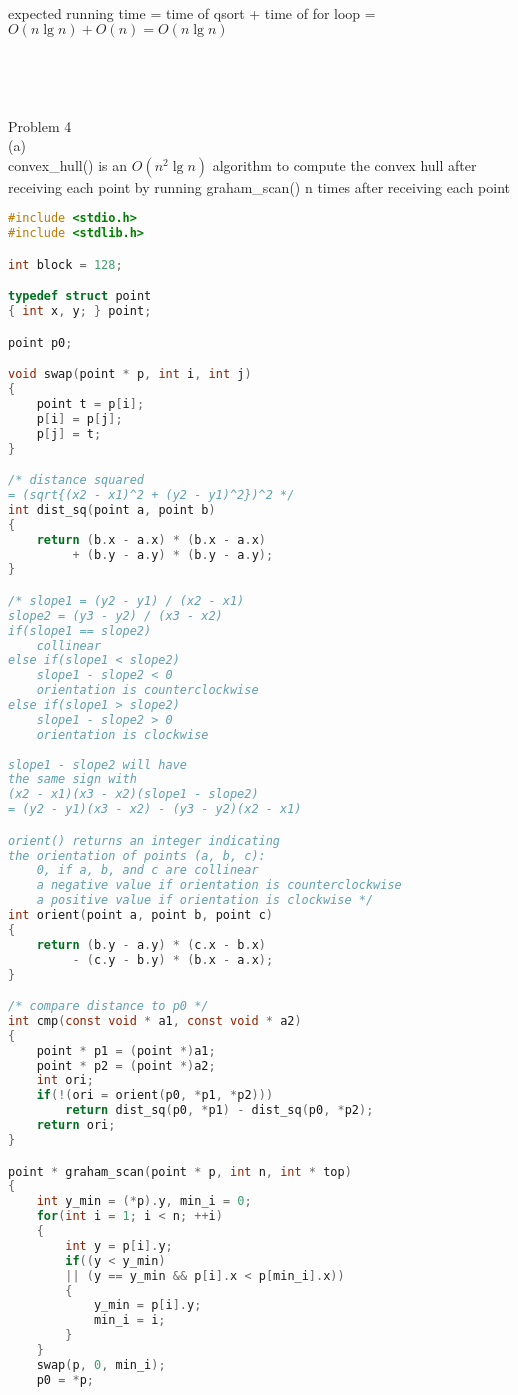 \documentclass[12pt,border=4pt,multi]{article} %
\begin{document}
\\
expected running time = time of qsort + time of for loop = $O(n \lg n) + O(n) = O(n \lg n)$\\
\\
\\
\\
\\
Problem 4\\
(a)\\
convex\_hull() is an $O(n^2 \lg n)$ algorithm 
to compute the convex hull 
after receiving each point
by running graham\_scan() n times 
after receiving each point\\
\begin{lstlisting}[language = c]
#include <stdio.h>
#include <stdlib.h>

int block = 128;

typedef struct point
{ int x, y; } point;

point p0;

void swap(point * p, int i, int j)
{
    point t = p[i];
    p[i] = p[j];
    p[j] = t;
}

/* distance squared 
= (sqrt{(x2 - x1)^2 + (y2 - y1)^2})^2 */
int dist_sq(point a, point b)
{
    return (b.x - a.x) * (b.x - a.x)
         + (b.y - a.y) * (b.y - a.y);
}

/* slope1 = (y2 - y1) / (x2 - x1)
slope2 = (y3 - y2) / (x3 - x2)
if(slope1 == slope2)
    collinear
else if(slope1 < slope2)
    slope1 - slope2 < 0
    orientation is counterclockwise
else if(slope1 > slope2)
    slope1 - slope2 > 0
    orientation is clockwise
    
slope1 - slope2 will have
the same sign with 
(x2 - x1)(x3 - x2)(slope1 - slope2)
= (y2 - y1)(x3 - x2) - (y3 - y2)(x2 - x1) 

orient() returns an integer indicating
the orientation of points (a, b, c):
    0, if a, b, and c are collinear
    a negative value if orientation is counterclockwise
    a positive value if orientation is clockwise */
int orient(point a, point b, point c)
{
    return (b.y - a.y) * (c.x - b.x)
         - (c.y - b.y) * (b.x - a.x);
}

/* compare distance to p0 */
int cmp(const void * a1, const void * a2)
{
    point * p1 = (point *)a1;
    point * p2 = (point *)a2;
    int ori;
    if(!(ori = orient(p0, *p1, *p2)))
        return dist_sq(p0, *p1) - dist_sq(p0, *p2);
    return ori;
}

point * graham_scan(point * p, int n, int * top)
{
    int y_min = (*p).y, min_i = 0;
    for(int i = 1; i < n; ++i)
    {
        int y = p[i].y;
        if((y < y_min) 
        || (y == y_min && p[i].x < p[min_i].x))
        {
            y_min = p[i].y;
            min_i = i;
        }
    }
    swap(p, 0, min_i);
    p0 = *p;
    

\end{lstlisting}
\end{document}
